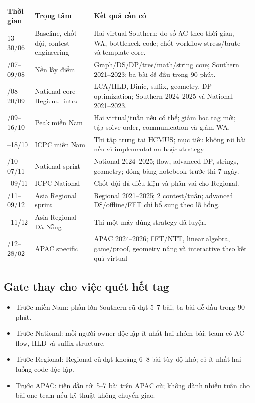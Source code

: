 \documentclass[11pt,a4paper]{article}
\begin{document}
\begin{longtable}{p{3.0cm}p{5.0cm}p{6.5cm}}
\toprule
\textbf{Thời gian} & \textbf{Trọng tâm} & \textbf{Kết quả cần có}\\
\midrule
13--30/06 & Baseline, chốt đội, contest engineering & Hai virtual Southern; đo số AC theo thời gian, WA, bottleneck code; chốt workflow stress/brute và template core.\\
\addlinespace
01/07--09/08 & Nền lấy điểm & Graph/DS/DP/tree/math/string core; Southern 2021--2023; ba bài dễ đầu trong 90 phút.\\
\addlinespace
10/08--20/09 & National core, Regional intro & LCA/HLD, Dinic, suffix, geometry, DP optimization; Southern 2024--2025 và National 2021--2023.\\
\addlinespace
21/09--16/10 & Peak miền Nam & Hai virtual/tuần nếu có thể; giảm học tag mới; tập solve order, communication và giảm WA.\\
\addlinespace
17--18/10 & ICPC miền Nam & Thi tập trung tại HCMUS; mục tiêu không rơi bài nền vì implementation hoặc strategy.\\
\addlinespace
19/10--07/11 & National sprint & National 2024--2025; flow, advanced DP, strings, geometry; đóng băng notebook trước thi 7 ngày.\\
\addlinespace
08--09/11 & ICPC National & Chốt đội đủ điều kiện và phân vai cho Regional.\\
\addlinespace
10/11--09/12 & Asia Regional sprint & Regional 2021--2025; 2 contest/tuần; advanced DS/offline/FFT chỉ bổ sung theo lỗ hổng.\\
\addlinespace
10--11/12 & Asia Regional Đà Nẵng & Thi một máy đúng strategy đã luyện.\\
\addlinespace
14/12--28/02 & APAC specific & APAC 2024--2026; FFT/NTT, linear algebra, game/proof, geometry nâng và interactive theo kết quả virtual.\\
\bottomrule
\end{longtable}

\subsection{Gate thay cho việc quét hết tag}

\begin{itemize}
  \item Trước miền Nam: phần lớn Southern cũ đạt 5--7 bài; ba bài dễ đầu trong 90 phút.
  \item Trước National: mỗi người owner độc lập ít nhất hai nhóm bài; team có AC flow, HLD và suffix structure.
  \item Trước Regional: Regional cũ đạt khoảng 6--8 bài tùy độ khó; có ít nhất hai luồng code độc lập.
  \item Trước APAC: tiến dần tới 5--7 bài trên APAC cũ; không dành nhiều tuần cho bài one-team nếu kỹ thuật không chuyển giao.
\end{itemize}
\end{document}
